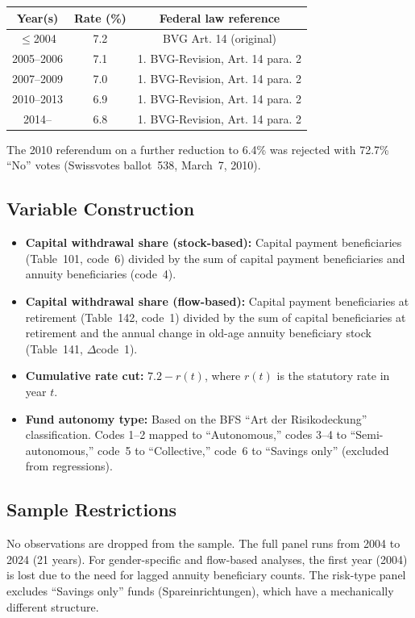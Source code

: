 \documentclass[12pt]{article}
\begin{document}
\begin{center}
\begin{tabular}{ccc}
\toprule
Year(s) & Rate (\%) & Federal law reference \\
\midrule
$\leq$2004 & 7.2 & BVG Art. 14 (original) \\
2005--2006 & 7.1 & 1. BVG-Revision, Art. 14 para. 2 \\
2007--2009 & 7.0 & 1. BVG-Revision, Art. 14 para. 2 \\
2010--2013 & 6.9 & 1. BVG-Revision, Art. 14 para. 2 \\
2014-- & 6.8 & 1. BVG-Revision, Art. 14 para. 2 \\
\bottomrule
\end{tabular}
\end{center}

The 2010 referendum on a further reduction to 6.4\% was rejected with 72.7\% ``No'' votes (Swissvotes ballot~538, March~7, 2010).

\subsection{Variable Construction}

\begin{itemize}
\item \textbf{Capital withdrawal share (stock-based):} Capital payment beneficiaries (Table~101, code~6) divided by the sum of capital payment beneficiaries and annuity beneficiaries (code~4).
\item \textbf{Capital withdrawal share (flow-based):} Capital payment beneficiaries at retirement (Table~142, code~1) divided by the sum of capital beneficiaries at retirement and the annual change in old-age annuity beneficiary stock (Table~141, $\Delta$code~1).
\item \textbf{Cumulative rate cut:} $7.2 - r(t)$, where $r(t)$ is the statutory rate in year $t$.
\item \textbf{Fund autonomy type:} Based on the BFS ``Art der Risikodeckung'' classification. Codes 1--2 mapped to ``Autonomous,'' codes 3--4 to ``Semi-autonomous,'' code~5 to ``Collective,'' code~6 to ``Savings only'' (excluded from regressions).
\end{itemize}

\subsection{Sample Restrictions}

No observations are dropped from the sample. The full panel runs from 2004 to 2024 (21 years). For gender-specific and flow-based analyses, the first year (2004) is lost due to the need for lagged annuity beneficiary counts. The risk-type panel excludes ``Savings only'' funds (Spareinrichtungen), which have a mechanically different structure.
\end{document}
